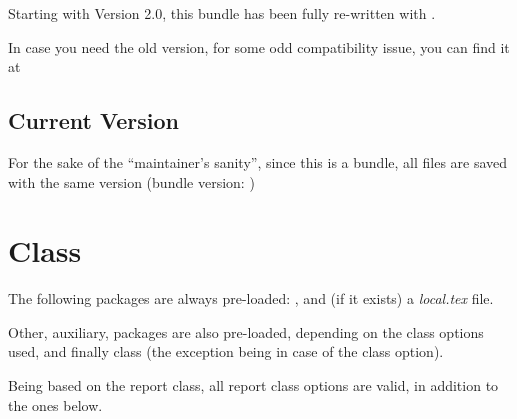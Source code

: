 \documentclass[article,nofontwarning,nogeometry,english,tocdepth=3,secdepth=3]{ufrgscca} %
\begin{document}
\begin{tsremark}
	Starting with Version 2.0, this bundle has been fully re-written with .
\end{tsremark}

\begin{tsremark}[Version 1.12a:]
	In case you need the old version, for some odd  compatibility issue, you can find it at 
\end{tsremark}

\subsection{Current Version}
For the sake of the “maintainer's sanity”, since this is a bundle, all files are saved with the same version (bundle version: )

\section{ Class}

The following packages are always pre-loaded: ,  and (if it exists) a \emph{local.tex} file.

Other, auxiliary, packages are also pre-loaded, depending on the class options used, and finally   class (the exception being in case of the  class option).

Being based on the report class, all report class options are valid, in addition to the ones below.
\end{document}
